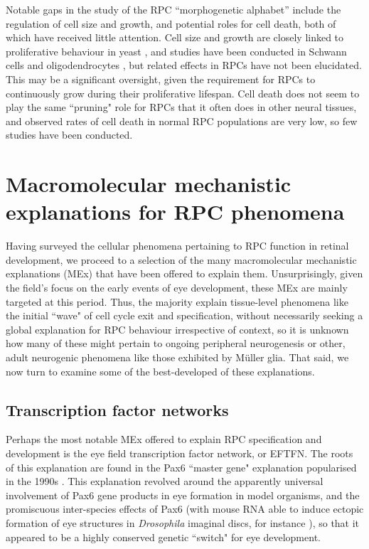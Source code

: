 \documentclass{ut-thesis}
\begin{document}
\begin{NoHyper}
Notable gaps in the study of the RPC ``morphogenetic alphabet'' include the regulation of cell size and growth, and potential roles for cell death, both of which have received little attention.  Cell size and growth are closely linked to proliferative behaviour in yeast \cite{Yang2011}, and studies have been conducted in Schwann cells and oligodendrocytes \cite{Conlon2001}, but related effects in RPCs have not been elucidated. This may be a significant oversight, given the requirement for RPCs to continuously grow during their proliferative lifespan. Cell death does not seem to play the same ``pruning" role for RPCs that it often does in other neural tissues, and observed rates of cell death in normal RPC populations are very low, so few studies have been conducted.

\section{Macromolecular mechanistic explanations for RPC phenomena}

Having surveyed the cellular phenomena pertaining to RPC function in retinal development, we proceed to a selection of the many macromolecular mechanistic explanations (MEx) \cite{Fagan2012} that have been offered to explain them. Unsurprisingly, given the field's focus on the early events of eye development, these MEx are mainly targeted at this period. Thus, the majority explain tissue-level phenomena like the initial ``wave" of cell cycle exit and specification, without necessarily seeking a global explanation for RPC behaviour irrespective of context, so it is unknown how many of these might pertain to ongoing peripheral neurogenesis or other, adult neurogenic phenomena like those exhibited by M{\"u}ller glia. That said, we now turn to examine some of the best-developed of these explanations.

\subsection{Transcription factor networks}

Perhaps the most notable MEx offered to explain RPC specification and development is the eye field transcription factor network, or EFTFN. The roots of this explanation are found in the Pax6 ``master gene" explanation popularised in the 1990s \cite{Gehring1996}. This explanation revolved around the apparently universal involvement of Pax6 gene products in eye formation in model organisms, and the promiscuous inter-species effects of Pax6 (with mouse RNA able to induce ectopic formation of eye structures in \textit{Drosophila} imaginal discs, for instance \cite{Halder1995}), so that it appeared to be a highly conserved genetic ``switch" for eye development.


\end{NoHyper}
\end{document}
